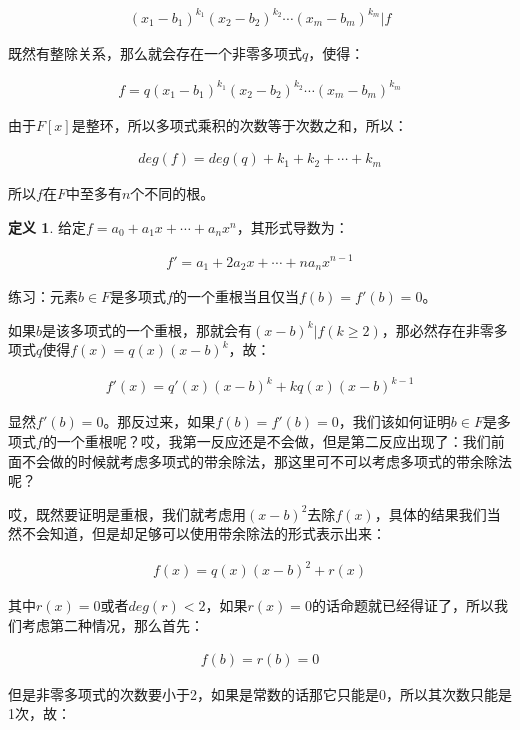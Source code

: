 \documentclass[12pt, a4paper, oneside]{ctexart}
\theoremstyle{definition}
\newtheorem*{definition}{定义}
\begin{document}
\begin{align*}
(x_1-b_1)^{k_1}(x_2-b_2)^{k_2}\cdots(x_m-b_m)^{k_m}|f
\end{align*}

既然有整除关系，那么就会存在一个非零多项式$q$，使得：

\begin{align*}
f=q(x_1-b_1)^{k_1}(x_2-b_2)^{k_2}\cdots(x_m-b_m)^{k_m}
\end{align*}

由于$F[x]$是整环，所以多项式乘积的次数等于次数之和，所以：

\begin{align*}
deg(f)=deg(q)+k_1+k_2+\cdots+k_m
\end{align*}

所以$f$在$F$中至多有$n$个不同的根。

\begin{definition}
给定$f=a_0+a_1x+\cdots+a_nx^n$，其形式导数为：

\begin{align*}
f'=a_1+2a_2x+\cdots+na_nx^{n-1}
\end{align*}
\end{definition}

练习：元素$b\in F$是多项式$f$的一个重根当且仅当$f(b)=f'(b)=0$。

如果$b$是该多项式的一个重根，那就会有$(x-b)^k|f(k\geqslant 2)$，那必然存在非零多项式$q$使得$f(x)=q(x)(x-b)^k$，故：

\begin{align*}
f'(x)=q'(x)(x-b)^k+kq(x)(x-b)^{k-1}
\end{align*}

显然$f'(b)=0$。那反过来，如果$f(b)=f'(b)=0$，我们该如何证明$b\in F$是多项式$f$的一个重根呢？哎，我第一反应还是不会做，但是第二反应出现了：我们前面不会做的时候就考虑多项式的带余除法，那这里可不可以考虑多项式的带余除法呢？

哎，既然要证明是重根，我们就考虑用$(x-b)^2$去除$f(x)$，具体的结果我们当然不会知道，但是却足够可以使用带余除法的形式表示出来：

\begin{align*}
f(x)=q(x)(x-b)^2+r(x)
\end{align*}

其中$r(x)=0$或者$deg(r)<2$，如果$r(x)=0$的话命题就已经得证了，所以我们考虑第二种情况，那么首先：

\begin{align*}
f(b)=r(b)=0
\end{align*}

但是非零多项式的次数要小于2，如果是常数的话那它只能是0，所以其次数只能是1次，故：
\end{document}
